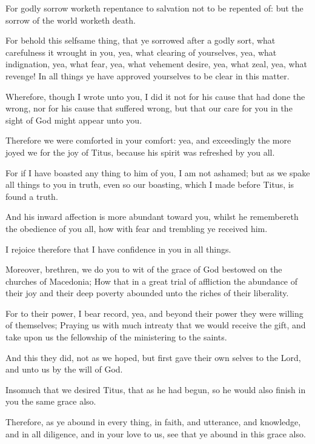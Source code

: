 \Verse For godly sorrow worketh repentance to salvation not to be repented of: but the sorrow of the world worketh death.

\Verse For behold this selfsame thing, that ye sorrowed after a godly sort, what carefulness it wrought in you, yea, what clearing of yourselves, yea, what indignation, yea, what fear, yea, what vehement desire, yea, what zeal, yea, what revenge! In all things ye have approved yourselves to be clear in this matter.

\Verse Wherefore, though I wrote unto you, I did it not for his cause that had done the wrong, nor for his cause that suffered wrong, but that our care for you in the sight of God might appear unto you.

\Verse Therefore we were comforted in your comfort: yea, and exceedingly the more joyed we for the joy of Titus, because his spirit was refreshed by you all.

\Verse For if I have boasted any thing to him of you, I am not ashamed; but as we spake all things to you in truth, even so our boasting, which I made before Titus, is found a truth.

\Verse And his inward affection is more abundant toward you, whilst he remembereth the obedience of you all, how with fear and trembling ye received him.

\Verse I rejoice therefore that I have confidence in you in all things.


\Chapter
\Verse Moreover, brethren, we do you to wit of the grace of God bestowed on the churches of Macedonia; \Verse How that in a great trial of affliction the abundance of their joy and their deep poverty abounded unto the riches of their liberality.

\Verse For to their power, I bear record, yea, and beyond their power they were willing of themselves; \Verse Praying us with much intreaty that we would receive the gift, and take upon us the fellowship of the ministering to the saints.

\Verse And this they did, not as we hoped, but first gave their own selves to the Lord, and unto us by the will of God.

\Verse Insomuch that we desired Titus, that as he had begun, so he would also finish in you the same grace also.

\Verse Therefore, as ye abound in every thing, in faith, and utterance, and knowledge, and in all diligence, and in your love to us, see that ye abound in this grace also.


